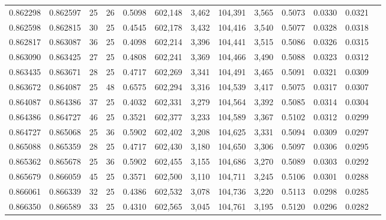\begin{tabular}{rrrrrrrrrrrrr}
0.862298 & 0.862597 &    25 &  26 &                                     0.5098 & 602,148 &   3,462 & 104,391 &   3,565 & 0.5073 & 0.0330 & 0.0321 \\
0.862598 & 0.862815 &    30 &  25 &                                     0.4545 & 602,178 &   3,432 & 104,416 &   3,540 & 0.5077 & 0.0328 & 0.0318 \\
0.862817 & 0.863087 &    36 &  25 &                                     0.4098 & 602,214 &   3,396 & 104,441 &   3,515 & 0.5086 & 0.0326 & 0.0315 \\
0.863090 & 0.863425 &    27 &  25 &                                     0.4808 & 602,241 &   3,369 & 104,466 &   3,490 & 0.5088 & 0.0323 & 0.0312 \\
0.863435 & 0.863671 &    28 &  25 &                                     0.4717 & 602,269 &   3,341 & 104,491 &   3,465 & 0.5091 & 0.0321 & 0.0309 \\
0.863672 & 0.864087 &    25 &  48 &                                     0.6575 & 602,294 &   3,316 & 104,539 &   3,417 & 0.5075 & 0.0317 & 0.0307 \\
0.864087 & 0.864386 &    37 &  25 &                                     0.4032 & 602,331 &   3,279 & 104,564 &   3,392 & 0.5085 & 0.0314 & 0.0304 \\
0.864386 & 0.864727 &    46 &  25 &                                     0.3521 & 602,377 &   3,233 & 104,589 &   3,367 & 0.5102 & 0.0312 & 0.0299 \\
0.864727 & 0.865068 &    25 &  36 &                                     0.5902 & 602,402 &   3,208 & 104,625 &   3,331 & 0.5094 & 0.0309 & 0.0297 \\
0.865088 & 0.865359 &    28 &  25 &                                     0.4717 & 602,430 &   3,180 & 104,650 &   3,306 & 0.5097 & 0.0306 & 0.0295 \\
0.865362 & 0.865678 &    25 &  36 &                                     0.5902 & 602,455 &   3,155 & 104,686 &   3,270 & 0.5089 & 0.0303 & 0.0292 \\
0.865679 & 0.866059 &    45 &  25 &                                     0.3571 & 602,500 &   3,110 & 104,711 &   3,245 & 0.5106 & 0.0301 & 0.0288 \\
0.866061 & 0.866339 &    32 &  25 &                                     0.4386 & 602,532 &   3,078 & 104,736 &   3,220 & 0.5113 & 0.0298 & 0.0285 \\
0.866350 & 0.866589 &    33 &  25 &                                     0.4310 & 602,565 &   3,045 & 104,761 &   3,195 & 0.5120 & 0.0296 & 0.0282 \\

\end{tabular}
